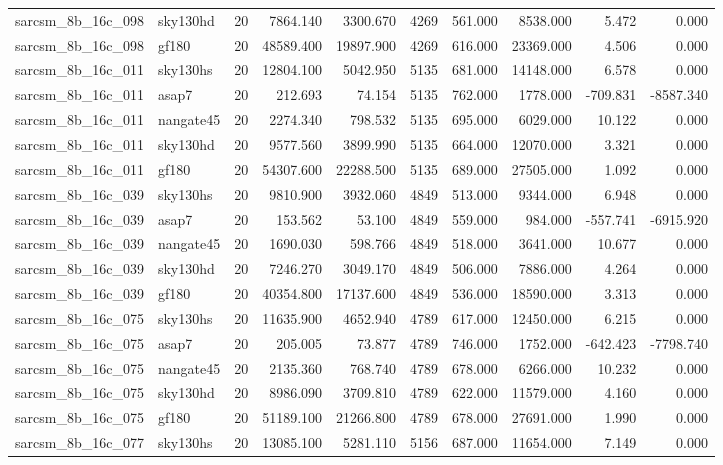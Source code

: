 \documentclass{article}
\begin{document}
\begin{longtable}{llrrrrrrrr}
sarcsm\_8b\_16c\_098 & sky130hd & 20 & 7864.140 & 3300.670 & 4269 & 561.000 & 8538.000 & 5.472 & 0.000 \\
sarcsm\_8b\_16c\_098 & gf180 & 20 & 48589.400 & 19897.900 & 4269 & 616.000 & 23369.000 & 4.506 & 0.000 \\
sarcsm\_8b\_16c\_011 & sky130hs & 20 & 12804.100 & 5042.950 & 5135 & 681.000 & 14148.000 & 6.578 & 0.000 \\
sarcsm\_8b\_16c\_011 & asap7 & 20 & 212.693 & 74.154 & 5135 & 762.000 & 1778.000 & -709.831 & -8587.340 \\
sarcsm\_8b\_16c\_011 & nangate45 & 20 & 2274.340 & 798.532 & 5135 & 695.000 & 6029.000 & 10.122 & 0.000 \\
sarcsm\_8b\_16c\_011 & sky130hd & 20 & 9577.560 & 3899.990 & 5135 & 664.000 & 12070.000 & 3.321 & 0.000 \\
sarcsm\_8b\_16c\_011 & gf180 & 20 & 54307.600 & 22288.500 & 5135 & 689.000 & 27505.000 & 1.092 & 0.000 \\
sarcsm\_8b\_16c\_039 & sky130hs & 20 & 9810.900 & 3932.060 & 4849 & 513.000 & 9344.000 & 6.948 & 0.000 \\
sarcsm\_8b\_16c\_039 & asap7 & 20 & 153.562 & 53.100 & 4849 & 559.000 & 984.000 & -557.741 & -6915.920 \\
sarcsm\_8b\_16c\_039 & nangate45 & 20 & 1690.030 & 598.766 & 4849 & 518.000 & 3641.000 & 10.677 & 0.000 \\
sarcsm\_8b\_16c\_039 & sky130hd & 20 & 7246.270 & 3049.170 & 4849 & 506.000 & 7886.000 & 4.264 & 0.000 \\
sarcsm\_8b\_16c\_039 & gf180 & 20 & 40354.800 & 17137.600 & 4849 & 536.000 & 18590.000 & 3.313 & 0.000 \\
sarcsm\_8b\_16c\_075 & sky130hs & 20 & 11635.900 & 4652.940 & 4789 & 617.000 & 12450.000 & 6.215 & 0.000 \\
sarcsm\_8b\_16c\_075 & asap7 & 20 & 205.005 & 73.877 & 4789 & 746.000 & 1752.000 & -642.423 & -7798.740 \\
sarcsm\_8b\_16c\_075 & nangate45 & 20 & 2135.360 & 768.740 & 4789 & 678.000 & 6266.000 & 10.232 & 0.000 \\
sarcsm\_8b\_16c\_075 & sky130hd & 20 & 8986.090 & 3709.810 & 4789 & 622.000 & 11579.000 & 4.160 & 0.000 \\
sarcsm\_8b\_16c\_075 & gf180 & 20 & 51189.100 & 21266.800 & 4789 & 678.000 & 27691.000 & 1.990 & 0.000 \\
sarcsm\_8b\_16c\_077 & sky130hs & 20 & 13085.100 & 5281.110 & 5156 & 687.000 & 11654.000 & 7.149 & 0.000 \\

\end{longtable}
\end{document}
